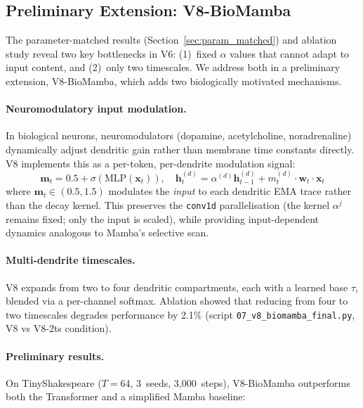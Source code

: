 \documentclass[11pt,a4paper]{article}
\begin{document}
\subsection{Preliminary Extension: V8-BioMamba}
\label{sec:v8}

The parameter-matched results (Section~\ref{sec:param_matched}) and ablation
study reveal two key bottlenecks in V6: (1)~fixed $\alpha$ values that
cannot adapt to input content, and (2)~only two timescales.
We address both in a preliminary extension, V8-BioMamba, which adds two
biologically motivated mechanisms.

\paragraph{Neuromodulatory input modulation.}
In biological neurons, neuromodulators (dopamine, acetylcholine, noradrenaline)
dynamically adjust dendritic gain rather than membrane time constants directly.
V8 implements this as a per-token, per-dendrite modulation signal:
\begin{equation}
  \mathbf{m}_t = 0.5 + \sigma\!\left(\mathrm{MLP}(\mathbf{x}_t)\right),
  \quad
  \mathbf{h}_t^{(d)} = \alpha^{(d)} \mathbf{h}_{t-1}^{(d)} + m_t^{(d)} \cdot \mathbf{w}_t \cdot \mathbf{x}_t
  \label{eq:neuromod}
\end{equation}
where $\mathbf{m}_t \in (0.5, 1.5)$ modulates the \emph{input} to each
dendritic EMA trace rather than the decay kernel. This preserves the
\texttt{conv1d} parallelisation (the kernel $\alpha^j$ remains fixed;
only the input is scaled), while providing input-dependent dynamics
analogous to Mamba's selective scan.

\paragraph{Multi-dendrite timescales.}
V8 expands from two to four dendritic compartments, each with a learned
base $\tau$, blended via a per-channel softmax. Ablation showed that
reducing from four to two timescales degrades performance by 2.1\%
(script \texttt{07\_v8\_biomamba\_final.py}, V8 vs V8-2ts condition).

\paragraph{Preliminary results.}
On TinyShakespeare ($T=64$, 3~seeds, 3,000~steps), V8-BioMamba
outperforms both the Transformer and a simplified Mamba baseline:
\end{document}
